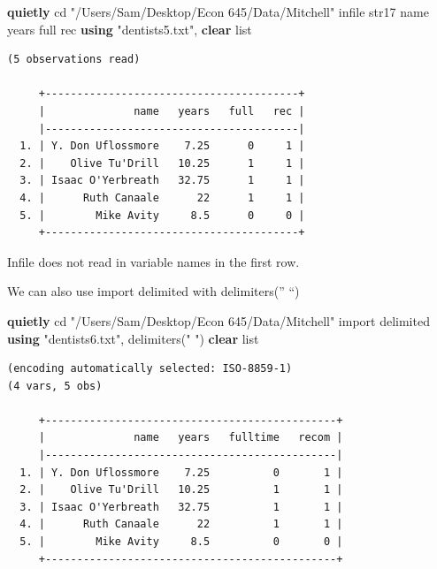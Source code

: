 \documentclass[
]{book}
\newenvironment{Shaded}{\begin{snugshade}}{\end{snugshade}}
\newcommand{\BaseNTok}[1]{\textcolor[rgb]{0.00,0.00,0.81}{#1}}
\newcommand{\KeywordTok}[1]{\textcolor[rgb]{0.13,0.29,0.53}{\textbf{#1}}}
\newcommand{\NormalTok}[1]{#1}
\newcommand{\OtherTok}[1]{\textcolor[rgb]{0.56,0.35,0.01}{#1}}
\newcommand{\StringTok}[1]{\textcolor[rgb]{0.31,0.60,0.02}{#1}}
\begin{document}
\begin{Shaded}
\begin{Highlighting}[]
\KeywordTok{quietly}\NormalTok{ cd }\StringTok{"/Users/Sam/Desktop/Econ 645/Data/Mitchell"}
\NormalTok{infile str17 }\BaseNTok{name}\NormalTok{ years full rec }\KeywordTok{using} \StringTok{"dentists5.txt"}\NormalTok{, }\KeywordTok{clear}
\OtherTok{list}
\end{Highlighting}
\end{Shaded}

\begin{verbatim}
(5 observations read)

     +----------------------------------------+
     |              name   years   full   rec |
     |----------------------------------------|
  1. | Y. Don Uflossmore    7.25      0     1 |
  2. |    Olive Tu'Drill   10.25      1     1 |
  3. | Isaac O'Yerbreath   32.75      1     1 |
  4. |      Ruth Canaale      22      1     1 |
  5. |        Mike Avity     8.5      0     0 |
     +----------------------------------------+
\end{verbatim}

Infile does not read in variable names in the first row.

We can also use import delimited with delimiters('' ``)

\begin{Shaded}
\begin{Highlighting}[]
\KeywordTok{quietly}\NormalTok{ cd }\StringTok{"/Users/Sam/Desktop/Econ 645/Data/Mitchell"}
\NormalTok{import delimited }\KeywordTok{using} \StringTok{"dentists6.txt"}\NormalTok{, delimiters(}\StringTok{" "}\NormalTok{) }\KeywordTok{clear}
\OtherTok{list}
\end{Highlighting}
\end{Shaded}

\begin{verbatim}
(encoding automatically selected: ISO-8859-1)
(4 vars, 5 obs)

     +----------------------------------------------+
     |              name   years   fulltime   recom |
     |----------------------------------------------|
  1. | Y. Don Uflossmore    7.25          0       1 |
  2. |    Olive Tu'Drill   10.25          1       1 |
  3. | Isaac O'Yerbreath   32.75          1       1 |
  4. |      Ruth Canaale      22          1       1 |
  5. |        Mike Avity     8.5          0       0 |
     +----------------------------------------------+
\end{verbatim}
\end{document}

